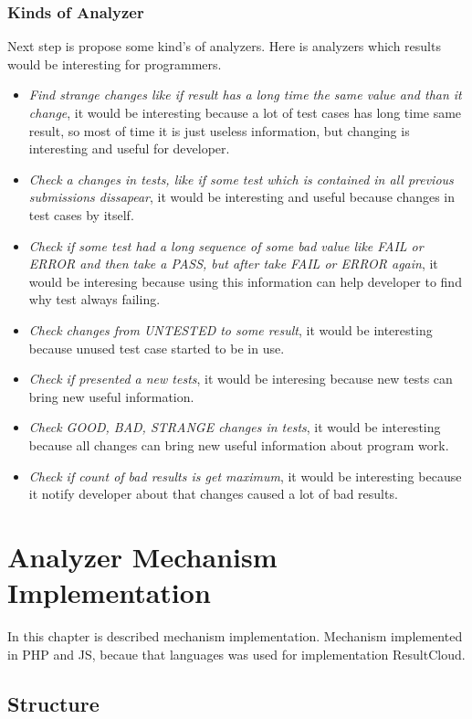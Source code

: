 \subsection{Kinds of Analyzer}

Next step is propose some kind's of analyzers. Here is analyzers which results would be interesting for programmers.
\begin{itemize} 
\item \emph{Find strange changes like if result has a long time the same value and than it change}, it would be interesting because a lot of test cases has long time same result, so most of time it is just useless information, but changing is interesting and useful for developer.
\item \emph{Check a changes in tests, like if some test which is contained in all previous submissions dissapear}, it would be interesting and useful because changes in test cases by itself.
\item \emph{Check if some test had a long sequence of some bad value like FAIL or ERROR and then take a PASS, but after take FAIL or ERROR again}, it would be interesing because using this information can help developer to find why test always failing.
\item \emph{Check changes from UNTESTED to some result}, it would be interesting because unused test case started to be in use.
\item \emph{Check if presented a new tests}, it would be interesing because new tests can bring new useful information.
\item \emph{Check GOOD, BAD, STRANGE changes in tests}, it would be interesting because all changes can bring new useful information about program work. 
\item \emph{Check if count of bad results is get maximum}, it would be interesting because it notify developer about that changes caused a lot of bad results.
\end{itemize}

\chapter{Analyzer Mechanism Implementation}
\label{ch:analyzer_implement}

In this chapter is described mechanism implementation. Mechanism implemented in PHP and JS, becaue that languages was used for implementation ResultCloud.

\section{Structure}

